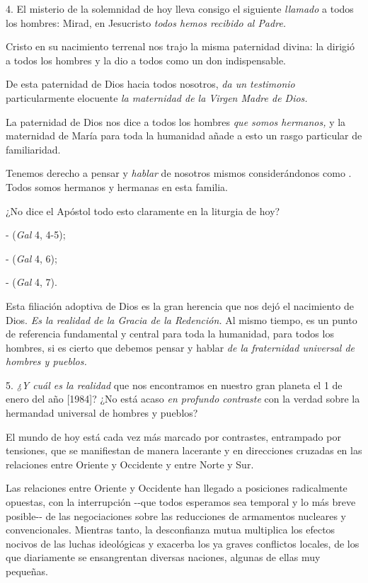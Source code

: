\begin{body}
	4. El misterio de la solemnidad de hoy lleva consigo el siguiente \emph{llamado} a todos los hombres: Mirad, en Jesucristo \emph{todos 	hemos recibido al Padre.}
	
	Cristo en su nacimiento terrenal nos trajo la misma paternidad divina: la dirigió a todos los hombres y la dio a todos como un don indispensable.
	
	De esta paternidad de Dios hacia todos nosotros, \emph{da un testimonio} particularmente elocuente \emph{la maternidad de la Virgen Madre de 	Dios.}
	
	La paternidad de Dios nos dice a todos los hombres \emph{que somos 	hermanos,} y la maternidad de María para toda la humanidad añade a esto un rasgo particular de familiaridad.
	
	Tenemos derecho a pensar y \emph{hablar} de nosotros mismos considerándonos como . Todos somos hermanos y hermanas en esta familia.
	
	¿No dice el Apóstol todo esto claramente en la liturgia de hoy?
	
	-  (\emph{Gal} 4, 4-5);
	
	-  (\emph{Gal} 4, 6);
	
	-  (\emph{Gal} 4, 7).
	
	Esta filiación adoptiva de Dios es la gran herencia que nos dejó el nacimiento de Dios. \emph{Es la realidad de la Gracia de la Redención.} Al mismo tiempo, es un punto de referencia fundamental y central para toda la humanidad, para todos los hombres, si es cierto que debemos pensar y hablar \emph{de la fraternidad universal de hombres y pueblos.}
	
	5. \emph{¿Y cuál es la realidad} que nos encontramos en nuestro gran planeta el 1 de enero del año {[}1984{]}? ¿No está acaso \emph{en 	profundo contraste} con la verdad sobre la hermandad universal de hombres y pueblos?
	
	El mundo de hoy está cada vez más marcado por contrastes, entrampado por tensiones, que se manifiestan de manera lacerante y en direcciones cruzadas en las relaciones entre Oriente y Occidente y entre Norte y Sur.
	
	Las relaciones entre Oriente y Occidente han llegado a posiciones radicalmente opuestas, con la interrupción -\/-que todos esperamos sea temporal y lo más breve posible-\/- de las negociaciones sobre las reducciones de armamentos nucleares y convencionales. Mientras tanto, la desconfianza mutua multiplica los efectos nocivos de las luchas ideológicas y exacerba los ya graves conflictos locales, de los que diariamente se ensangrentan diversas naciones, algunas de ellas muy pequeñas.
	

\end{body}
